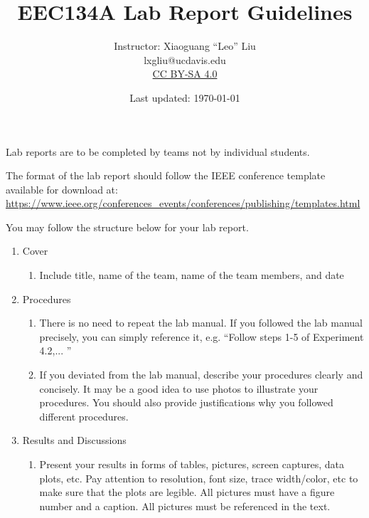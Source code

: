 \documentclass[letterpaper, 11pt]{article}
\title{EEC134A Lab Report Guidelines}
\author{Instructor: Xiaoguang ``Leo'' Liu \\ lxgliu@ucdavis.edu \\ \small \href{http://creativecommons.org/licenses/by-sa/4.0/}{CC BY-SA 4.0}}
\date{Last updated: \today}
\begin{document}
\maketitle

Lab reports are to be completed by teams not by individual students. 

The format of the lab report should follow the IEEE conference template available for download at: \url{https://www.ieee.org/conferences_events/conferences/publishing/templates.html}

You may follow the structure below for your lab report. 

\begin{enumerate}
	\item Cover
		\begin{enumerate}
			\item Include title, name of the team, name of the team members, and date 
		\end{enumerate}
	\item Procedures
		\begin{enumerate}
			\item There is no need to repeat the lab manual. If you followed the lab manual precisely, you can simply reference it, e.g. ``Follow steps 1-5 of Experiment 4.2,... ''
			
			\item If you deviated from the lab manual, describe your procedures clearly and concisely. It may be a good idea to use photos to illustrate your procedures. You should also provide justifications why you followed different procedures. 
		\end{enumerate}
	\item Results and Discussions
		\begin{enumerate}
			\item Present your results in forms of tables, pictures, screen captures, data plots, etc. Pay attention to resolution, font size, trace width/color, etc to make sure that the plots are legible. All pictures must have a figure number and a caption. All pictures must be referenced in the text.
			

\end{enumerate}
\end{enumerate}
\end{document}

